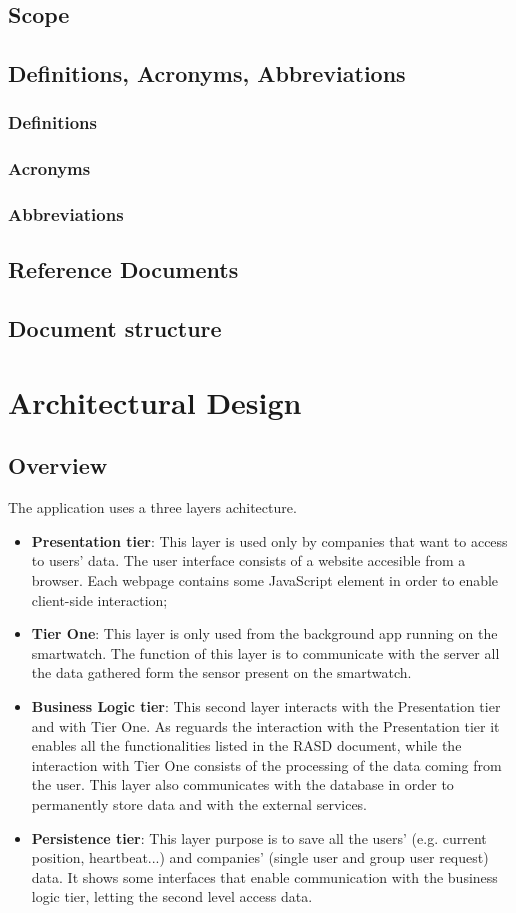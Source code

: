 \documentclass{article}
\begin{document}
\subsection{Scope}
\subsection{Definitions, Acronyms, Abbreviations}
\subsubsection{Definitions}
\subsubsection{Acronyms}
\subsubsection{Abbreviations}
\subsection{Reference Documents}
\subsection{Document structure}
\newpage
\section{Architectural Design}
\subsection{Overview}
The application uses a three layers achitecture.
\begin{itemize}
\item \textbf{Presentation tier}: This layer is used only by companies that want to access to users' data. The user interface consists of a website accesible from a browser. Each webpage contains some JavaScript element in order to enable client-side interaction;
\item \textbf{Tier One}: This layer is only used from the background app running on the smartwatch. The function of this layer is to communicate with the server all the data gathered form the sensor present on the smartwatch. 
\item \textbf{Business Logic tier}: This second layer interacts with the Presentation tier and with Tier One. As reguards the interaction with the Presentation tier it enables all the functionalities listed in the RASD document, while the interaction with Tier One consists of the processing of the data coming from the user. This layer also communicates with the database in order to permanently store data and with the external services.
\item \textbf{Persistence tier}: This layer purpose is to save all the users' (e.g. current position, heartbeat...) and companies' (single user and group user request) data. It shows some interfaces that enable communication with the business logic tier, letting the second level access data.
\end{itemize}
\end{document}
